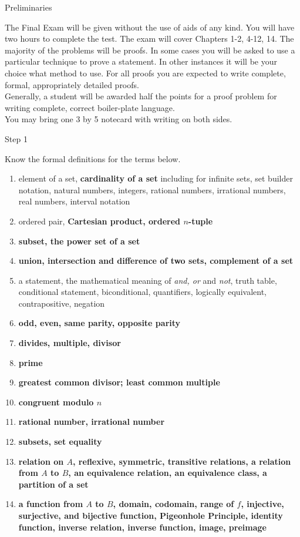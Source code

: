 \documentclass[12pt]{article}
\newcommand{\be}{\begin{enumerate}}
\newcommand{\ee}{\end{enumerate}}
\begin{document}
\thispagestyle{fancy}

\begin{center} Preliminaries \end{center}

The Final Exam will be given without the use of aids of any kind. You will have two hours to complete the test. The exam will cover Chapters 1-2, 4-12, 14. The majority of the problems will be proofs.  In some cases you will be asked to use a particular technique to prove a statement. In other instances it will be your choice what method to use. For all proofs you are expected to write complete, formal, appropriately detailed proofs.\\

Generally, a student will be awarded half the points for a proof problem for writing complete, correct boiler-plate language.\\

You may bring one 3 by 5 notecard with writing on both sides.\\

\begin{center} Step 1 \end{center}

Know the formal definitions for  the terms below. 
\be
\item element of a set, \textbf{cardinality of a set}  including for infinite sets, set builder notation, {natural numbers, integers, rational numbers, irrational numbers, real numbers}, interval notation
\item ordered pair, \textbf{Cartesian product, ordered $n$-tuple}
\item \textbf{subset, the power set of a set}
\item \textbf{union, intersection and difference of two sets, complement of a set}
\item a statement, the mathematical meaning of \emph{and, or} and \emph{not}, truth table, conditional statement, biconditional, quantifiers, logically equivalent, contrapositive, negation
\item \textbf{odd, even, same parity, opposite parity}
\item \textbf{divides, multiple, divisor}
\item \textbf{prime}
\item \textbf{greatest common divisor; least common multiple}
\item \textbf{congruent modulo $n$}
\item \textbf{rational number, irrational number}
\item \textbf{subsets, set equality}
\item \textbf{relation on $A$, reflexive, symmetric, transitive relations, a relation from $A$ to $B$, an equivalence relation, an equivalence class, a partition of a set}
\item \textbf{a function from $A$ to $B$, domain, codomain, range of $f$, injective, surjective, and bijective function, Pigeonhole Principle, identity function, inverse relation, inverse function, image, preimage}
\ee
\newpage
\end{document}
